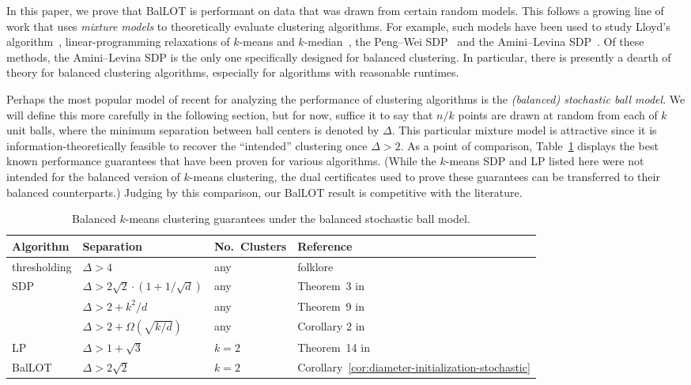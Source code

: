 \documentclass{article}
\theoremstyle{plain}
\theoremstyle{definition}
\newcommand{\1}{\mathbf{1}}
\begin{document}
In this paper, we prove that BalLOT is performant on data that was drawn from certain random models.
This follows a growing line of work that uses \textit{mixture models} to theoretically evaluate clustering algorithms.
For example, such models have been used to study Lloyd's algorithm~\cite{lu2016statistical,awasthi2018clustering}, linear-programming relaxations of $k$-means and $k$-median~\cite{nellore2015recovery,awasthi2015relax,DeRosaKhajavirad2022RatioCut,DelPiaMa2023KMedian}, the Peng--Wei SDP~\cite{awasthi2015relax,iguchi2017probably,mixon2017clustering,li2020when} and the Amini--Levina SDP~\cite{fei2022hidden}.
Of these methods, the Amini--Levina SDP is the only one specifically designed for balanced clustering.
In particular, there is presently a dearth of theory for balanced clustering algorithms, especially for algorithms with reasonable runtimes.

Perhaps the most popular model of recent for analyzing the performance of clustering algorithms is the \textit{(balanced) stochastic ball model}.
We will define this more carefully in the following section, but for now, suffice it to say that $n/k$ points are drawn at random from each of $k$ unit balls, where the minimum separation between ball centers is denoted by $\Delta$.
This particular mixture model is attractive since it is information-theoretically feasible to recover the ``intended'' clustering once $\Delta>2$.
As a point of comparison, Table~\ref{table.separations} displays the best known performance guarantees that have been proven for various algorithms.
(While the $k$-means SDP and LP listed here were not intended for the balanced version of $k$-means clustering, the dual certificates used to prove these guarantees can be transferred to their balanced counterparts.)
Judging by this comparison, our BalLOT result is competitive with the literature.


\begin{table}[t]
\centering
\begin{tabular}{llll}\hline
Algorithm & Separation &  No.\ Clusters \qquad\qquad & Reference \\ \hline\hline
thresholding \qquad\qquad & $\Delta>4$ & any & folklore \\ \hline
SDP & $\Delta > 2\sqrt{2}\cdot(1+1/\sqrt{d})$ \qquad\qquad & any & Theorem~3 in \cite{awasthi2015relax} \\
& $\Delta > 2+k^2/d$ & any & Theorem~9 in \cite{iguchi2017probably} \\
& $\Delta > 2+\Omega(\sqrt{k/d})$ & any & Corollary 2 in \cite{li2020when}\\\hline
LP & $\Delta > 1+\sqrt{3}$ & $k=2$ & Theorem~14 in \cite{DeRosaKhajavirad2022RatioCut} \\\hline
BalLOT & $\Delta>2\sqrt{2}$ & $k=2$ & Corollary~\ref{cor:diameter-initialization-stochastic} \\\hline
\end{tabular}
\caption{Balanced $k$-means clustering guarantees under the balanced stochastic ball model.}
\label{table.separations}
\end{table}
\end{document}
